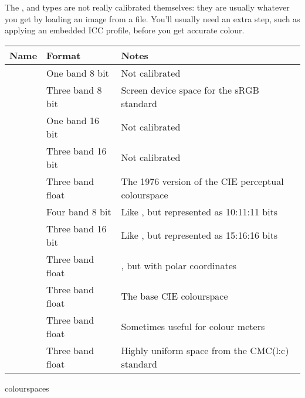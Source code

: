 The ,  and  types are not really calibrated
themselves: they are usually whatever you get by loading an image from a file.
You'll usually need an extra step, such as applying an embedded ICC profile,
before you get accurate colour.

\begin{tab2}
\begin{center}
\begin{tabular}{||l|l|l||}
\hline
Name & Format & Notes \\
\hline
\ct{Mono} & One band 8 bit & 
	Not calibrated \\
\ct{sRGB} & Three band 8 bit & 
	Screen device space for the sRGB standard \\
\ct{GREY16} & One band 16 bit & 
	Not calibrated \\
\ct{RGB16} & Three band 16 bit & 
	Not calibrated \\
\ct{Lab} & Three band float & 
	The 1976 version of the CIE perceptual colourspace \\
\ct{LabQ} & Four band 8 bit & 
	Like \ct{Lab}, but represented as 10:11:11 bits \\
\ct{LabS} & Three band 16 bit & 
	Like \ct{Lab}, but represented as 15:16:16 bits \\
\ct{LCh} & Three band float & 
	\ct{Lab}, but with polar coordinates \\
\ct{XYZ} & Three band float & 
	The base CIE colourspace \\
\ct{Yxy} & Three band float & 
	Sometimes useful for colour meters \\
\ct{UCS} & Three band float & 
	Highly uniform space from the CMC(l:c) standard \\
\hline
\end{tabular}
\end{center}
\caption{\nip{} colourspaces}
\end{tab2}

